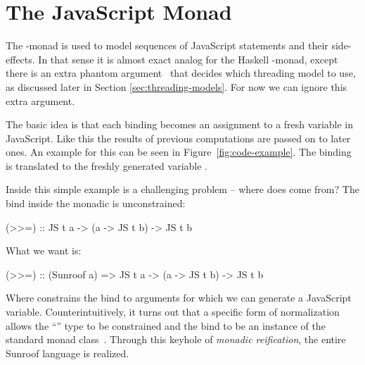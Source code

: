  
\section{The JavaScript Monad}
\label{sec:js-monad}

The \JS-monad is
used to model sequences of JavaScript statements and
their side-effects. In that sense it is almost
exact analog for the Haskell \IO-monad, except there
is an extra phantom argument~\cite{Leijen:99:Phantom} 
that decides which threading model to use, as
discussed later in Section \ref{sec:threading-models}.
For now we can ignore this extra argument.

The basic idea is that each binding becomes an
assignment to a fresh variable in JavaScript. Like
this the results of previous computations are passed on to 
later ones.
An example for this can be seen in Figure~\ref{fig:code-example}.
The binding  is translated to the freshly generated
variable .

Inside this simple example is a challenging problem -- where does
 come from? The bind inside the monadic  is
unconstrained:
\begin{Code}
(>>=) :: JS t a -> (a -> JS t b) -> JS t b
\end{Code}
What we want is:
\begin{Code}
(>>=) :: (Sunroof a) => JS t a -> (a -> JS t b) -> JS t b
\end{Code}
Where  constrains the bind to
arguments for which we can generate a JavaScript variable.
Counterintuitively, 
it turns out that a specific form of normalization allows 
the ``'' type to be constrained and the bind to 
be an instance of the standard monad class~\cite{Sculthorpe:13:ConstrainedMonads}.
Through this keyhole of {\em monadic reification},
the entire Sunroof language is realized. 

